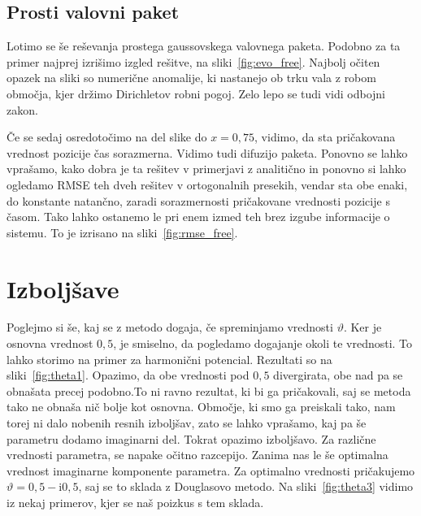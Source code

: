 \documentclass{porocilo}
\newcommand{\ii}{\mathrm{i}}
\begin{document}


\subsection{Prosti valovni paket}
Lotimo se še reševanja prostega gaussovskega valovnega paketa. Podobno za ta primer najprej izrišimo izgled rešitve, na sliki~\ref{fig:evo_free}. Najbolj očiten opazek na sliki so numerične anomalije, ki nastanejo ob trku vala z robom območja, kjer držimo Dirichletov robni pogoj. Zelo lepo se tudi vidi odbojni zakon. 

Če se sedaj osredotočimo na del slike do $x = 0,75$, vidimo, da sta pričakovana vrednost pozicije čas sorazmerna. Vidimo tudi difuzijo paketa. Ponovno se lahko vprašamo, kako dobra je ta rešitev v primerjavi z analitično in ponovno si lahko ogledamo RMSE teh dveh rešitev v ortogonalnih presekih, vendar sta obe enaki, do konstante natančno, zaradi sorazmernosti pričakovane vrednosti pozicije s časom. Tako lahko ostanemo le pri enem izmed teh brez izgube informacije o sistemu. To je izrisano na sliki~\ref{fig:rmse_free}.



\section{Izboljšave}
Poglejmo si še, kaj se z metodo dogaja, če spreminjamo vrednosti $\vartheta$. Ker je osnovna vrednost $0,5$, je smiselno, da pogledamo dogajanje okoli te vrednosti. To lahko storimo na primer za harmonični potencial. Rezultati so na sliki~\ref{fig:theta1}. Opazimo, da obe vrednosti pod $0,5$ divergirata, obe nad pa se obnašata precej podobno.To ni ravno rezultat, ki bi ga pričakovali, saj se metoda tako ne obnaša nič bolje kot osnovna. Območje, ki smo ga preiskali tako, nam torej ni dalo nobenih resnih izboljšav, zato se lahko vprašamo, kaj pa še parametru dodamo imaginarni del. Tokrat opazimo izboljšavo. Za različne vrednosti parametra, se napake očitno razcepijo. Zanima nas le še optimalna vrednost imaginarne komponente parametra. Za optimalno vrednosti pričakujemo $\vartheta = 0,5 - \ii 0,5$, saj se to sklada z Douglasovo metodo. Na sliki~\ref{fig:theta3} vidimo iz nekaj primerov, kjer se naš poizkus s tem sklada.
\end{document}
